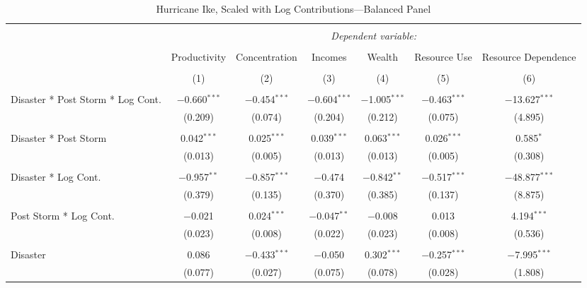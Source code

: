 
\begin{table}[!htbp] \centering 
  \caption{Hurricane Ike, Scaled with Log Contributions---Balanced Panel} 
  \label{} 
\footnotesize 
\begin{tabular}{@{\extracolsep{5pt}}lcccccc} 
\\[-1.8ex]\hline 
\hline \\[-1.8ex] 
 & \multicolumn{6}{c}{\textit{Dependent variable:}} \\ 
\cline{2-7} 
\\[-1.8ex] & Productivity & Concentration & Incomes & Wealth & Resource Use & Resource Dependence \\ 
\\[-1.8ex] & (1) & (2) & (3) & (4) & (5) & (6)\\ 
\hline \\[-1.8ex] 
 Disaster * Post Storm * Log Cont. & $-$0.660$^{***}$ & $-$0.454$^{***}$ & $-$0.604$^{***}$ & $-$1.005$^{***}$ & $-$0.463$^{***}$ & $-$13.627$^{***}$ \\ 
  & (0.209) & (0.074) & (0.204) & (0.212) & (0.075) & (4.895) \\ 
  & & & & & & \\ 
 Disaster * Post Storm & 0.042$^{***}$ & 0.025$^{***}$ & 0.039$^{***}$ & 0.063$^{***}$ & 0.026$^{***}$ & 0.585$^{*}$ \\ 
  & (0.013) & (0.005) & (0.013) & (0.013) & (0.005) & (0.308) \\ 
  & & & & & & \\ 
 Disaster * Log Cont. & $-$0.957$^{**}$ & $-$0.857$^{***}$ & $-$0.474 & $-$0.842$^{**}$ & $-$0.517$^{***}$ & $-$48.877$^{***}$ \\ 
  & (0.379) & (0.135) & (0.370) & (0.385) & (0.137) & (8.875) \\ 
  & & & & & & \\ 
 Post Storm *  Log Cont. & $-$0.021 & 0.024$^{***}$ & $-$0.047$^{**}$ & $-$0.008 & 0.013 & 4.194$^{***}$ \\ 
  & (0.023) & (0.008) & (0.022) & (0.023) & (0.008) & (0.536) \\ 
  & & & & & & \\ 
 Disaster & 0.086 & $-$0.433$^{***}$ & $-$0.050 & 0.302$^{***}$ & $-$0.257$^{***}$ & $-$7.995$^{***}$ \\ 
  & (0.077) & (0.027) & (0.075) & (0.078) & (0.028) & (1.808) \\ 

\end{tabular}
\end{table}
